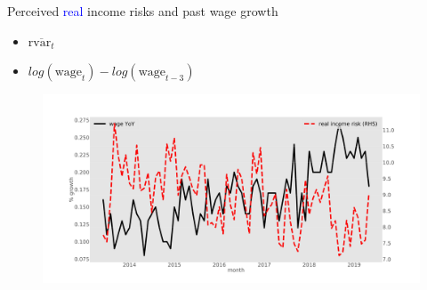 \documentclass{beamer}
\begin{document}
\begin{frame}{Perceived \textcolor{blue}{real} income risks and past wage growth}
	\begin{itemize}
	\item $\overline{\text{rvar}_{t}} $
	\item  $log(\text{wage}_t) - log(\text{wage}_{t-3})$
\end{itemize}
	\begin{figure}
		\centering 
		\label{ts_skew}
		\includegraphics[width=\textwidth]{figures/tsMeanrvar_he.jpg}
	\end{figure}
\end{frame}
\end{document}
